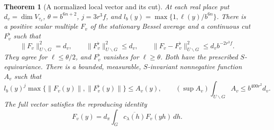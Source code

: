 \documentclass[a4paper,11pt]{article}
\newtheorem{theorem}[proposition]{Theorem}
\theoremstyle{definition}
\theoremstyle{remark}
\numberwithin{equation}{section}
\begin{document}
\begin{theorem}[A normalized local vector and its cut]\leavevmode
\label{thm:normalizedcut699}
At each real place put \(d_v=\dim V_{\tau_v}\),
\(\theta=b^{6n+2}\), \(j=3r^3 f\), and
\(l_b(y)=\max\{1,\ell(y)/b^{6n}\}\).
There is a positive scalar multiple \(F_v\) of the
stationary Bessel average and a continuous cut \(F_v^\flat\)
such that
\[
 \|F_v\|_{U\backslash G}^2=d_v,\qquad
 \|F_v^\flat\|_{U\backslash G}^2\le d_v,\qquad
 \|F_v-F_v^\flat\|_{U\backslash G}^2\le d_v b^{-2r^3 f}.
\]
They agree for \(\ell\le\theta/2\), and \(F_v^\flat\) vanishes
for \(\ell\ge\theta\). Both have the prescribed \(S\)-equivariance.
There is a bounded, measurable, \(S\)-invariant nonnegative
function \(A_v\) such that
\[
    l_b(y)^j\max\{\|F_v(y)\|,\|F_v^\flat(y)\|\}\le A_v(y),
    \qquad
    (\sup A_v)\int_{U\backslash G}A_v\le b^{400r^2}d_v .
\]
The full vector satisfies the reproducing identity
\[
       F_v(y)=d_\pi\int_G\overline{c_\lambda(h)}F_v(yh)\,dh .
\]
\end{theorem}
\end{document}
